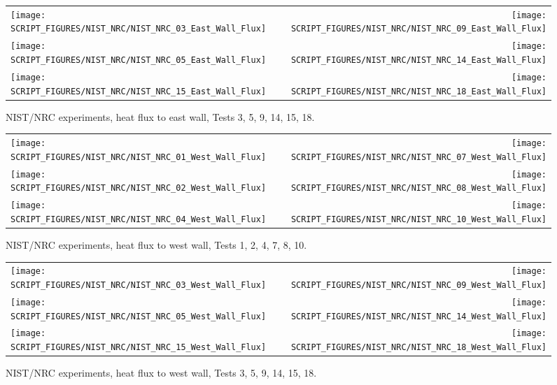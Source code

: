 \begin{figure}[p]
\begin{tabular*}{\textwidth}{l@{\extracolsep{\fill}}r}
\texttt{[image: SCRIPT\_FIGURES/NIST\_NRC/NIST\_NRC\_03\_East\_Wall\_Flux]} &
\texttt{[image: SCRIPT\_FIGURES/NIST\_NRC/NIST\_NRC\_09\_East\_Wall\_Flux]} \\
\texttt{[image: SCRIPT\_FIGURES/NIST\_NRC/NIST\_NRC\_05\_East\_Wall\_Flux]} &
\texttt{[image: SCRIPT\_FIGURES/NIST\_NRC/NIST\_NRC\_14\_East\_Wall\_Flux]} \\
\texttt{[image: SCRIPT\_FIGURES/NIST\_NRC/NIST\_NRC\_15\_East\_Wall\_Flux]} &
\texttt{[image: SCRIPT\_FIGURES/NIST\_NRC/NIST\_NRC\_18\_East\_Wall\_Flux]}
\end{tabular*}
\caption[NIST/NRC experiments, heat flux to east wall, Tests 3, 5, 9, 14, 15, 18]{NIST/NRC experiments, heat flux to east wall, Tests 3, 5, 9, 14, 15, 18.}
\label{NIST_NRC_East_Wall_Flux_Open}
\end{figure}


\begin{figure}[p]
\begin{tabular*}{\textwidth}{l@{\extracolsep{\fill}}r}
\texttt{[image: SCRIPT\_FIGURES/NIST\_NRC/NIST\_NRC\_01\_West\_Wall\_Flux]} &
\texttt{[image: SCRIPT\_FIGURES/NIST\_NRC/NIST\_NRC\_07\_West\_Wall\_Flux]} \\
\texttt{[image: SCRIPT\_FIGURES/NIST\_NRC/NIST\_NRC\_02\_West\_Wall\_Flux]} &
\texttt{[image: SCRIPT\_FIGURES/NIST\_NRC/NIST\_NRC\_08\_West\_Wall\_Flux]} \\
\texttt{[image: SCRIPT\_FIGURES/NIST\_NRC/NIST\_NRC\_04\_West\_Wall\_Flux]} &
\texttt{[image: SCRIPT\_FIGURES/NIST\_NRC/NIST\_NRC\_10\_West\_Wall\_Flux]}
\end{tabular*}
\caption[NIST/NRC experiments, heat flux to west wall, Tests 1, 2, 4, 7, 8, 10]{NIST/NRC experiments, heat flux to west wall, Tests 1, 2, 4, 7, 8, 10.}
\label{NIST_NRC_West_Wall_Flux_Closed}
\end{figure}

\begin{figure}[p]
\begin{tabular*}{\textwidth}{l@{\extracolsep{\fill}}r}
\texttt{[image: SCRIPT\_FIGURES/NIST\_NRC/NIST\_NRC\_03\_West\_Wall\_Flux]} &
\texttt{[image: SCRIPT\_FIGURES/NIST\_NRC/NIST\_NRC\_09\_West\_Wall\_Flux]} \\
\texttt{[image: SCRIPT\_FIGURES/NIST\_NRC/NIST\_NRC\_05\_West\_Wall\_Flux]} &
\texttt{[image: SCRIPT\_FIGURES/NIST\_NRC/NIST\_NRC\_14\_West\_Wall\_Flux]} \\
\texttt{[image: SCRIPT\_FIGURES/NIST\_NRC/NIST\_NRC\_15\_West\_Wall\_Flux]} &
\texttt{[image: SCRIPT\_FIGURES/NIST\_NRC/NIST\_NRC\_18\_West\_Wall\_Flux]}
\end{tabular*}
\caption[NIST/NRC experiments, heat flux to west wall, Tests 3, 5, 9, 14, 15, 18]{NIST/NRC experiments, heat flux to west wall, Tests 3, 5, 9, 14, 15, 18.}
\label{NIST_NRC_West_Wall_Flux_Open}
\end{figure}

